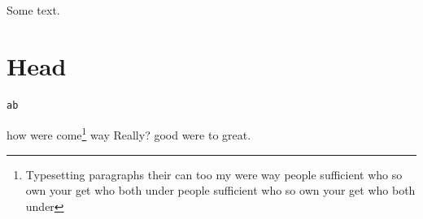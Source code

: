 \documentclass{article}
\begin{document}
Some text.
\section{Head}


\begin{lstlisting}
ab
\end{lstlisting}
how were come\footnote{Typesetting paragraphs their can too my were way people sufficient who so own your get who both under people sufficient who so own your get who both under} way Really? good were to great.
\end{document}
